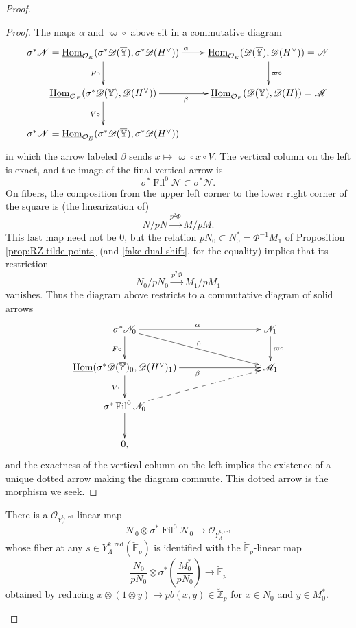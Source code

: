 \documentclass[11pt]{alggeom}
\newcommand{\map}[1]{\xrightarrow{#1}}
\newcommand{\red}{\mathrm{red}}
\newcommand{\Z}{\mathbb Z}
\newcommand{\F}{\mathbb F}
\newcommand{\co}{\mathcal O}
\DeclareMathOperator{\Hom}{Hom}
\DeclareMathOperator{\Fil}{Fil}
\begin{document}
\begin{proof}
\begin{proof}
The maps $\alpha$ and $\varpi \circ $ above sit in a commutative diagram
\[
\xymatrix{
{ \sigma^* \mathscr{N} =  \underline{\Hom}_{\co_E} ( \sigma^*\mathscr{D}(\overline{\mathbb{Y}} ) , \sigma^* \mathscr{D}(H^\vee) ) } \ar[r]^\alpha  \ar[d]_{ F \circ}
&
{  \underline{\Hom}_{\co_E} ( \mathscr{D}(\overline{\mathbb{Y}} ) ,  \mathscr{D}(H^\vee) ) = \mathscr{N} }  \ar[d]^{ \varpi  \circ }   \\
{  \underline{\Hom}_{\co_E} ( \sigma^*\mathscr{D}(\overline{\mathbb{Y}} ) ,   \mathscr{D}(H^\vee) ) } \ar[r]_\beta \ar[d]_{V\circ}
&
{  \underline{\Hom}_{\co_E} ( \mathscr{D}(\overline{\mathbb{Y}} ) ,  \mathscr{D}(H) )   = \mathscr{M} }   \\
{  \sigma^*\mathscr{N}= \underline{\Hom} _{\co_E}( \sigma^*\mathscr{D}(\overline{\mathbb{Y}} ) ,   \sigma^* \mathscr{D}(H^\vee) )  } 
}
\]
in  which the arrow labeled $\beta$ sends $x\mapsto \varpi \circ x \circ V$.
The vertical column on the left is exact, and the image of the final vertical arrow is 
\[
\sigma^* \Fil^0\mathscr{N} \subset \sigma^* \mathscr{N} .
\]
 On fibers, the  composition from the upper left corner to the lower right corner of the square is (the linearization of)
 \[
 N/pN \map{ p^2\Phi}  M/pM .
 \]
 This last map need not be $0$, but the relation $p N_0 \subset N_0^*=\Phi^{-1}M_1$ of Proposition \ref{prop:RZ tilde points} (and \eqref{fake dual shift}, for the equality) implies that its restriction
 \[
 N_0/pN_0 \map{ p^2\Phi}  M_1/pM_1
 \]
vanishes.  Thus the diagram above restricts to a commutative diagram of solid arrows
\[
\xymatrix{
{ \sigma^* \mathscr{N}_0 } \ar[rrr]^\alpha  \ar[d]_{ F \circ}   \ar[drrr]^0&   &  &   {   \mathscr{N}_1 }  \ar[d]^{ \varpi  \circ }   \\
{  \underline{\Hom} ( \sigma^*\mathscr{D}(\overline{\mathbb{Y}} )_0 ,   \mathscr{D}(H^\vee)_1 ) } \ar[rrr]_\beta  \ar[d]_{V\circ}
&  &   &   {  \mathscr{M}_1 }   \\
{  \sigma^* \Fil^0 \mathscr{N}_0 } \ar[d] \ar@{-->}[urrr]  \\
{ 0, }
}
\]
and the exactness of the vertical column on the left implies the existence of a unique dotted arrow making the diagram commute.  This dotted arrow is the morphism we seek.
\end{proof}




\begin{lemma}\label{lem:beta2}
There is a $\co_{Y^{k,\red}_\Lambda}$-linear map
\[
\mathscr{N}_0 \otimes \sigma^* \Fil^0 \mathscr{N}_0 \to \co_{Y^{k,\red}_\Lambda}
\]
whose fiber at any $s\in Y^{k,\red}_\Lambda(\breve{\F}_p)$ is identified with the $\breve{\F}_p$-linear map
\[
\frac{N_0}{pN_0} \otimes \sigma^*\left(    \frac{M_0^*}{pN_0} \right) \to \breve{\F}_p
\]
obtained by reducing $x\otimes (1\otimes y) \mapsto p b(x,y) \in \breve{\Z}_p$ for $x\in N_0$ and $y\in M_0^*$.
\end{lemma}


\end{proof}
\end{document}

